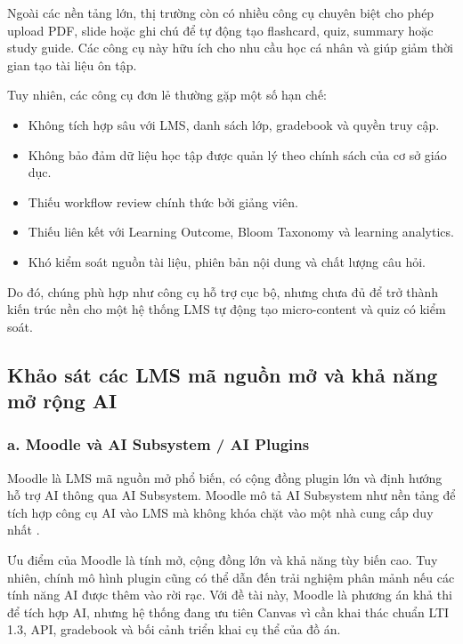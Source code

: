 Ngoài các nền tảng lớn, thị trường còn có nhiều công cụ chuyên biệt cho phép
upload PDF, slide hoặc ghi chú để tự động tạo flashcard, quiz, summary hoặc
study guide. Các công cụ này hữu ích cho nhu cầu học cá nhân và giúp giảm thời
gian tạo tài liệu ôn tập.

Tuy nhiên, các công cụ đơn lẻ thường gặp một số hạn chế:

\begin{itemize}
    \item Không tích hợp sâu với LMS, danh sách lớp, gradebook và quyền truy
          cập.
    \item Không bảo đảm dữ liệu học tập được quản lý theo chính sách của cơ sở
          giáo dục.
    \item Thiếu workflow review chính thức bởi giảng viên.
    \item Thiếu liên kết với Learning Outcome, Bloom Taxonomy và learning
          analytics.
    \item Khó kiểm soát nguồn tài liệu, phiên bản nội dung và chất lượng câu
          hỏi.
\end{itemize}

Do đó, chúng phù hợp như công cụ hỗ trợ cục bộ, nhưng chưa đủ để trở thành kiến
trúc nền cho một hệ thống LMS tự động tạo micro-content và quiz có kiểm soát.

\subsection{Khảo sát các LMS mã nguồn mở và khả năng mở rộng AI}

\subsubsection*{a. Moodle và AI Subsystem / AI Plugins}

Moodle là LMS mã nguồn mở phổ biến, có cộng đồng plugin lớn và định hướng hỗ
trợ AI thông qua AI Subsystem. Moodle mô tả AI Subsystem như nền tảng để tích
hợp công cụ AI vào LMS mà không khóa chặt vào một nhà cung cấp duy
nhất \cite{moodle-ai}.

Ưu điểm của Moodle là tính mở, cộng đồng lớn và khả năng tùy biến cao. Tuy
nhiên, chính mô hình plugin cũng có thể dẫn đến trải nghiệm phân mảnh nếu các
tính năng AI được thêm vào rời rạc. Với đề tài này, Moodle là phương án khả thi
để tích hợp AI, nhưng hệ thống đang ưu tiên Canvas vì cần khai thác chuẩn LTI
1.3, API, gradebook và bối cảnh triển khai cụ thể của đồ án.

